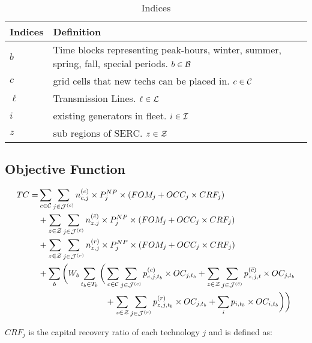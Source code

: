 \documentclass[11pt, oneside]{article}   	%
\newcommand{\bc}{\bar{c}}
\begin{document}
\begin{table}[H]
   \centering
   \caption{Indices}
   \begin{tabular}{p{1in} p{4in} } %
      \toprule
      \textbf{Indices} & \textbf{Definition} \\
      \midrule
      $b$ & Time blocks representing peak-hours, winter, summer, spring, fall, special periods. $b \in \mathcal{B}$\\
      $c$ & grid cells that new techs can be placed in. $c \in \mathcal{C}$ \\
      $\ell$ & Transmission Lines. $\ell \in \mathcal{L}$\\
      $i$ & existing generators in fleet. $i \in \mathcal{I}$\\
      $z$ & sub regions of SERC. $z \in \mathcal{Z}$\\
      \bottomrule
   \end{tabular}
   \label{tab:indices}
\end{table}

\subsection{Objective Function}

\begin{equation} \label{eq:obj_fun}
\begin{split}
TC = &  \sum_{c \in \Cc}\sum_{j \in \Jc^{(c)}} n^{(c)}_{c, j} \times P^{NP}_{j} \times (FOM_{j} + OCC_{j} \times CRF_{j}) \\
& +  \sum_{z \in \Zc}\sum_{j \in \Jc^{(\bc)}} n^{(\bc)}_{z, j} \times P^{NP}_{j} \times (FOM_{j} + OCC_{j} \times CRF_{j}) \\
& +  \sum_{z \in \Zc}\sum_{j \in \Jc^{(r)}} n^{(r)}_{z, j} \times P^{NP}_{j} \times (FOM_{j} + OCC_{j} \times CRF_{j}) \\
& + \sum_b \bigg( W_b \sum_{t_b \in T_b}\bigg( \sum_{c \in \Cc}\sum_{j \in \Jc^{(c)}} p^{(c)}_{c, j, t_b} \times OC_{j, t_b} + \sum_{z \in \Zc}\sum_{j \in \Jc^{(\bc)}} p^{(\bc)}_{z, j, t} \times OC_{j, t_b} \\
& \qquad\qquad\qquad\qquad +  \sum_{z \in \Zc}\sum_{j \in \Jc^{(r)}} p^{(r)}_{z, j, t_b} \times OC_{j, t_b} + \sum_{i} p_{i, t_b} \times OC_{i, t_b} \bigg)\bigg)
\end{split}
\end{equation}

$CRF_j$ is the capital recovery ratio of each technology $j$ and is defined as:
\end{document}
